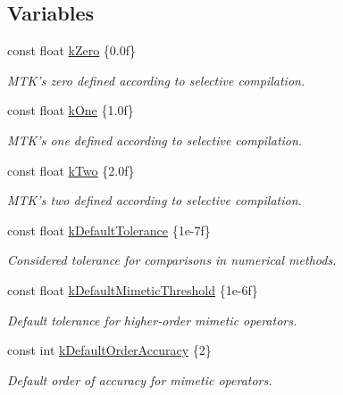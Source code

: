 \subsection*{Variables}
\begin{DoxyCompactItemize}
\item 
const float \hyperlink{group__c01-roots_ga59a451a5fae30d59649bcda274fea271}{k\+Zero} \{0.\+0f\}
\begin{DoxyCompactList}\small\item\em M\+T\+K's zero defined according to selective compilation. \end{DoxyCompactList}\item 
const float \hyperlink{group__c01-roots_ga26407c24d43b6b95480943340d285c71}{k\+One} \{1.\+0f\}
\begin{DoxyCompactList}\small\item\em M\+T\+K's one defined according to selective compilation. \end{DoxyCompactList}\item 
const float \hyperlink{group__c01-roots_gaf39c2d851a2db744f4feb1c5ab3ec2cf}{k\+Two} \{2.\+0f\}
\begin{DoxyCompactList}\small\item\em M\+T\+K's two defined according to selective compilation. \end{DoxyCompactList}\item 
const float \hyperlink{group__c01-roots_gae914b125d81d1b97e0aee7bbc7739786}{k\+Default\+Tolerance} \{1e-\/7f\}
\begin{DoxyCompactList}\small\item\em Considered tolerance for comparisons in numerical methods. \end{DoxyCompactList}\item 
const float \hyperlink{group__c01-roots_ga35718d949bdc81a08a9cc8ebbe3478a2}{k\+Default\+Mimetic\+Threshold} \{1e-\/6f\}
\begin{DoxyCompactList}\small\item\em Default tolerance for higher-\/order mimetic operators. \end{DoxyCompactList}\item 
const int \hyperlink{group__c01-roots_ga0d95560098eb36420511103637b6952f}{k\+Default\+Order\+Accuracy} \{2\}
\begin{DoxyCompactList}\small\item\em Default order of accuracy for mimetic operators. \end{DoxyCompactList}\item 

\end{DoxyCompactItemize}
